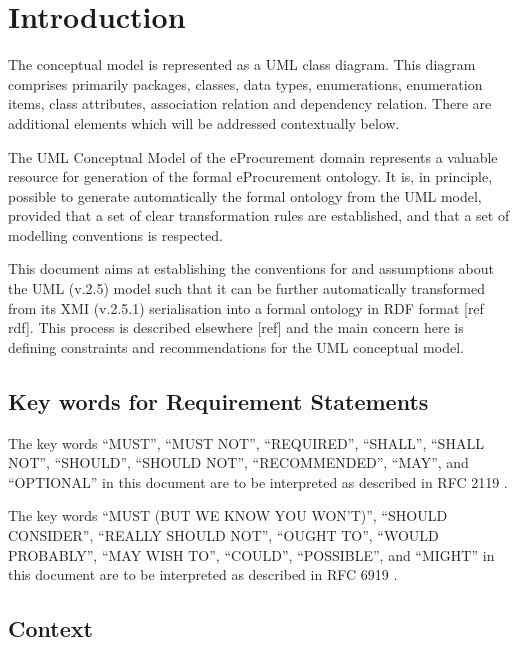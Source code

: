 \section{Introduction}
\label{sec:introduction}


The conceptual model is represented as a UML class diagram. This diagram comprises primarily packages, classes, data types, enumerations, enumeration items, class attributes, association relation and dependency relation. There are additional elements which will be addressed contextually below. 

The UML Conceptual Model of the eProcurement domain represents a valuable resource for generation of the formal eProcurement ontology. It is, in principle, possible to generate automatically the formal ontology from the UML model, provided that a set of clear transformation rules are established, and that a set of modelling conventions is respected. 

This document aims at establishing the conventions for and assumptions about the UML (v.2.5) model such that it can be further automatically transformed from its XMI (v.2.5.1) serialisation into a formal ontology in RDF format [ref rdf].  This process is described elsewhere [ref] and the main concern here is defining constraints and recommendations for the  UML conceptual model. 

\subsection{Key words for Requirement Statements}
\label{sec:keywords}
The key words ``MUST'', ``MUST NOT'', ``REQUIRED'', ``SHALL'', ``SHALL  NOT'', ``SHOULD'', ``SHOULD NOT'', ``RECOMMENDED'',  ``MAY'', and ``OPTIONAL'' in this document are to be interpreted as described in RFC 2119 \cite{rfc2119}.

The key words ``MUST (BUT WE KNOW YOU WON'T)'', ``SHOULD CONSIDER'', ``REALLY SHOULD NOT'', ``OUGHT TO'', ``WOULD PROBABLY'', ``MAY WISH TO'', ``COULD'', ``POSSIBLE'', and ``MIGHT'' in this document are to be interpreted as described in RFC 6919 \cite{rfc6919}.

\subsection{Context}
\label{sec:context}
